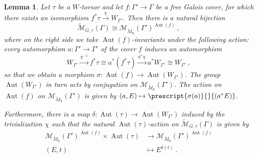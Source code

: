 \documentclass[10pt, a4paper]{amsart}
\newtheorem{lemma}[theorem]{Lemma}
\theoremstyle{definition}
\theoremstyle{myitemstyle}
\newcommand{\R}{\mathbb{R}}
\newcommand{\Mcheck}{{\check{M}}}
\newcommand{\mc}[1]{{\mathcal{#1}}}
\DeclareMathOperator{\Aut}{Aut}
\newcommand{\Ga}{\Gamma}
\begin{document}
\begin{lemma}
\label{lem:description of torsors as equivariant torsors on cover}
Let $\tau$ be a $W$-torsor and let $f\colon \Gamma'\to \Gamma$ be a free Galois cover, for which there exists an isomorphism $f^*\tau\xrightarrow{\chi} W_{\Gamma'}$. Then there is a natural bijection
\[
    \widetilde{\mc M}_{G,\tau}(\Ga)\cong \mc M_{\Mcheck_\R}(\Gamma')^{\Aut(f)} \ ,
\]
where on the right side we take $\Aut(f)$-invariants under the following action: every automorphism $a:\Gamma'\to \Gamma'$ of the cover $f$ induces an automorphism 
\[
    W_{\Gamma'}\xrightarrow{\chi^{-1}}f^*\tau\cong a^*(f^*\tau)\xrightarrow{a^*\chi}a^*W_{\Gamma'}\cong W_{\Gamma'} \ ,
\]
so that we obtain a morphism $\sigma\colon\Aut(f)\to \Aut(W_{\Gamma'})$. The group $\Aut(W_{\Gamma'})$ in turn acts by conjugation on $\mc M_{\Mcheck_\R}(\Gamma')$. The action on $\Aut(f)$ on $\mc M_{\Mcheck_\R}(\Gamma')$ is given by $(a,E)\mapsto \prescript{\sigma(a)}{}{(a^*E)}$.

Furthermore, there is a map $\delta\colon \Aut(\tau)\to \Aut(W_{\Gamma'})$ induced by the trivialization $\chi$ such that the natural $\Aut(\tau)$-action on $\widetilde{\mc M}_{G,\tau}(\Ga)$ is given by
\begin{equation*}\begin{split}
\mc M_{\Mcheck_\R}(\Gamma')^{\Aut(f)}\times \Aut(\tau)&\longrightarrow \mc M_{\Mcheck_\R}(\Gamma')^{\Aut(f)}\\
(E,t)&\longmapsto {E}^{\delta(t)} \ .
\end{split}\end{equation*}
\end{lemma}
\end{document}
